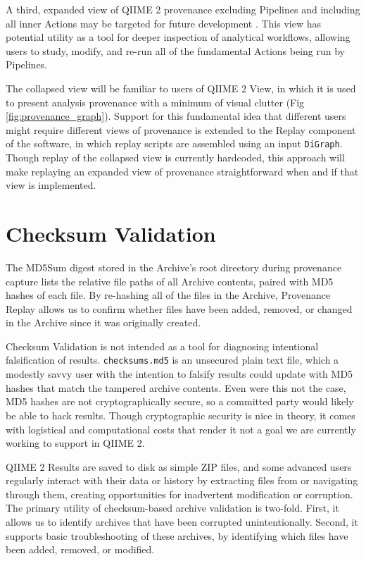 A third, expanded view of QIIME 2 provenance excluding Pipelines and including
all inner Actions may be targeted for future development \parencite[Issue 74]{keefe_issues_2021}.
This view has potential utility as a tool for deeper inspection of analytical
workflows, allowing users to study, modify, and re-run all of the fundamental
Actions being run by Pipelines. 

The collapsed view will be familiar to users of QIIME 2 View, in which it is used to
present analysis provenance with a minimum of visual clutter (Fig \ref{fig:provenance_graph}).
Support for this fundamental idea that different users might require different
views of provenance is extended to the Replay component of the software, in
which replay scripts are assembled using an input \texttt{DiGraph}. Though replay of the
collapsed view is currently hardcoded, this approach will make replaying an
expanded view of provenance straightforward when and if that view is
implemented.


\section{Checksum Validation}

The MD5Sum digest stored in the Archive’s root directory during provenance
capture lists the relative file paths of all Archive contents, paired with MD5
hashes of each file.  By re-hashing all of the files in the Archive, Provenance
Replay allows us to confirm whether files have been added, removed, or changed
in the Archive since it was originally created. 

Checksum Validation is not intended as a tool for diagnosing intentional
falsification of results. \texttt{checksums.md5} is an unsecured plain text file, which a
modestly savvy user with the intention to falsify results could update with MD5
hashes that match the tampered archive contents. Even were this not the case,
MD5 hashes are not cryptographically secure, so a committed party would likely
be able to hack results. Though cryptographic security is nice in theory, it
comes with logistical and computational costs that render it not a goal we are
currently working to support in QIIME 2.

QIIME 2 Results are saved to disk as simple ZIP files, and some advanced users
regularly interact with their data or history by extracting files from or
navigating through them, creating opportunities for inadvertent modification or
corruption. The primary utility of checksum-based archive validation is
two-fold. First, it allows us to identify archives that have been corrupted
unintentionally. Second, it supports basic troubleshooting of these archives, by
identifying which files have been added, removed, or modified. 

